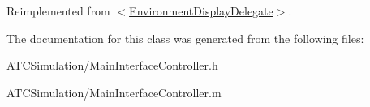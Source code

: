 \-Reimplemented from \hyperlink{protocol_environment_display_delegate-p_aee15f5cb6ec0982ef420038d8204346d}{$<$\-Environment\-Display\-Delegate$>$}.



\-The documentation for this class was generated from the following files\-:\begin{DoxyCompactItemize}
\item 
\-A\-T\-C\-Simulation/\-Main\-Interface\-Controller.\-h\item 
\-A\-T\-C\-Simulation/\-Main\-Interface\-Controller.\-m\end{DoxyCompactItemize}
